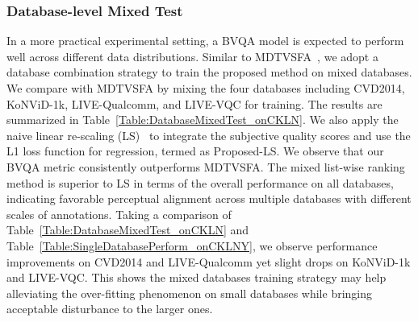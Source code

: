 \documentclass[journal]{IEEEtran}
\begin{document}
{{\subsubsection{Database-level Mixed Test}\label{subsubsec:DatabaseMixedTest}
In a more practical experimental setting, a BVQA model is expected to perform well across different data distributions. Similar to MDTVSFA~\cite{li2021unified}, we adopt a database combination strategy to train the proposed method on mixed databases. We compare with MDTVSFA by mixing the four databases including CVD2014, KoNViD-1k, LIVE-Qualcomm, and LIVE-VQC for training. The results are summarized in Table~\ref{Table:DatabaseMixedTest_onCKLN}. We also apply the naive linear re-scaling (LS)~\cite{korhonen2019two} to integrate the subjective quality scores and use the L1 loss function for regression, termed as Proposed-LS. We observe that our BVQA metric consistently outperforms MDTVSFA. The mixed list-wise ranking method is superior to LS in terms of the overall performance on all databases, indicating favorable perceptual alignment across multiple databases with different scales of annotations. Taking a comparison of Table~\ref{Table:DatabaseMixedTest_onCKLN} and Table~\ref{Table:SingleDatabasePerform_onCKLNY}, we observe performance improvements on CVD2014 and LIVE-Qualcomm yet slight drops on KoNViD-1k and LIVE-VQC. This shows the mixed databases training strategy may help alleviating the over-fitting phenomenon on small databases while bringing acceptable disturbance to the larger ones.





}}
\end{document}
